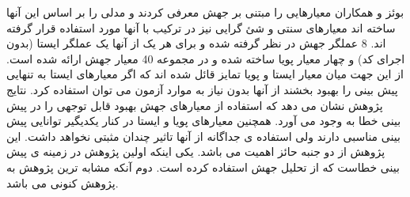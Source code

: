  بوئز و همکاران معیارهایی را مبتنی بر جهش معرفی کردند و مدلی را بر اساس این آنها ساخته اند\cite{bowes2016mutation} معیارهای سنتی و شئ گرایی نیز در ترکیب با آنها مورد استفاده قرار گرفته اند. 8 عملگر جهش در نظر گرفته شده و برای هر یک از آنها یک عملگر ایستا (بدون اجرای کد) و چهار معیار پویا ساخته شده و در مجموعه 40 معیار جهش ارائه شده است. از این جهت میان معیار ایستا و پویا تمایز قائل شده اند که اگر معیارهای ایستا به تنهایی  پیش بینی را بهبود بخشند از آنها بدون نیاز به موارد آزمون می توان استفاده کرد. نتایج پژوهش نشان می دهد که استفاده از معیارهای جهش بهبود قابل توجهی را در پیش بینی خطا به وجود می آورد. همچنین معیارهای پویا و ایستا در کنار یکدیگیر توانایی پیش بینی مناسبی دارند ولی استفاده ی جداگانه از آنها تاثیر چندان مثبتی نخواهد داشت. این پژوهش از دو جنبه حائز اهمیت می باشد. یکی اینکه اولین پژوهش در زمینه ی پیش بینی خطاست که از تحلیل جهش استفاده کرده است. دوم آنکه مشابه ترین پژوهش به پژوهش کنونی می باشد. 
 
 
 
 
 
 
 
 
 
 
 
 
 
 
 
 
 
 
 
 
 

